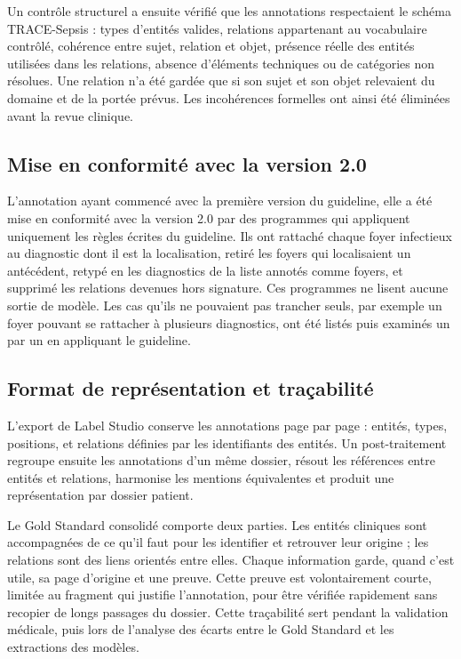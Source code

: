 Un contrôle structurel a ensuite vérifié que les annotations respectaient le schéma TRACE-Sepsis : types d’entités valides, relations appartenant au vocabulaire contrôlé, cohérence entre sujet, relation et objet, présence réelle des entités utilisées dans les relations, absence d’éléments techniques ou de catégories non résolues. Une relation n’a été gardée que si son sujet et son objet relevaient du domaine et de la portée prévus. Les incohérences formelles ont ainsi été éliminées avant la revue clinique.

\subsection{Mise en conformité avec la version 2.0}\label{sec:c3-3-8-3}

L’annotation ayant commencé avec la première version du guideline, elle a été mise en conformité avec la version 2.0 par des programmes qui appliquent uniquement les règles écrites du guideline. Ils ont rattaché chaque foyer infectieux au diagnostic dont il est la localisation, retiré les foyers qui localisaient un antécédent, retypé en  les diagnostics de la liste annotés comme foyers, et supprimé les relations devenues hors signature. Ces programmes ne lisent aucune sortie de modèle. Les cas qu’ils ne pouvaient pas trancher seuls, par exemple un foyer pouvant se rattacher à plusieurs diagnostics, ont été listés puis examinés un par un en appliquant le guideline.

\subsection{Format de représentation et traçabilité}\label{sec:c3-3-8-4}

L’export de Label Studio conserve les annotations page par page : entités, types, positions, et relations définies par les identifiants des entités. Un post-traitement regroupe ensuite les annotations d’un même dossier, résout les références entre entités et relations, harmonise les mentions équivalentes et produit une représentation par dossier patient.

Le Gold Standard consolidé comporte deux parties. Les entités cliniques sont accompagnées de ce qu’il faut pour les identifier et retrouver leur origine ; les relations sont des liens orientés entre elles. Chaque information garde, quand c’est utile, sa page d’origine et une preuve. Cette preuve est volontairement courte, limitée au fragment qui justifie l’annotation, pour être vérifiée rapidement sans recopier de longs passages du dossier. Cette traçabilité sert pendant la validation médicale, puis lors de l’analyse des écarts entre le Gold Standard et les extractions des modèles.

